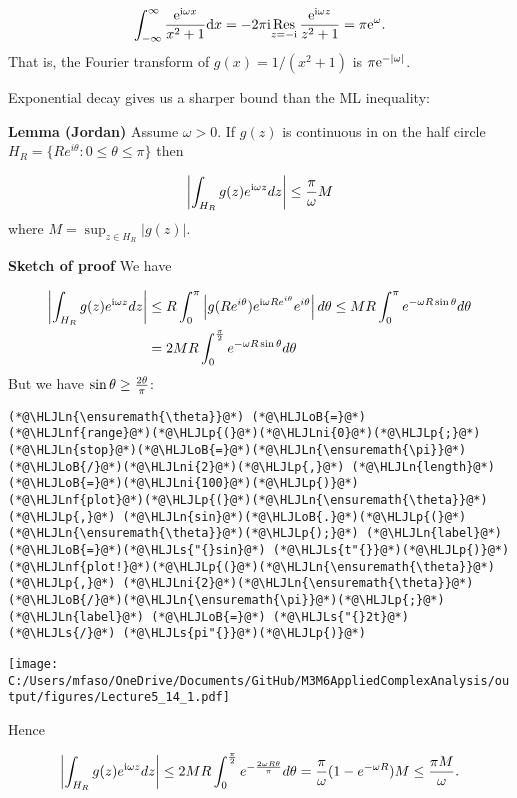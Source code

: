 \documentclass[12pt,a4paper]{article}
\newcommand{\HLJLn}[1]{#1}
\newcommand{\HLJLnf}[1]{\textcolor[RGB]{66,102,213}{#1}}
\newcommand{\HLJLs}[1]{\textcolor[RGB]{201,61,57}{#1}}
\newcommand{\HLJLni}[1]{\textcolor[RGB]{59,151,46}{#1}}
\newcommand{\HLJLoB}[1]{\textcolor[RGB]{102,102,102}{\textbf{#1}}}
\newcommand{\HLJLp}[1]{#1}
\def\D{ {\rm d} }
\def\I{ {\rm i} }
\def\E{ {\rm e} }
\def\Res_#1{\underset{#1}{\rm Res}\,}
\begin{document}
\[
\int_{-\infty}^\infty {\E^{\I \omega x } \over x^2 + 1} \D x = -2 \pi \I \Res_{z = -\I} {\E^{\I \omega z } \over z^2 + 1} = \pi \E^{\omega}.
\]
That is, the Fourier transform of $g(x) = 1/(x^2+1)$ is $\pi \E^{-|\omega|}$.

Exponential decay gives us a  sharper bound than the ML inequality:

\textbf{Lemma (Jordan)} Assume $\omega > 0$. If $g(z)$ is continuous in on the half circle $H_R = \{ R e^{i \theta} : 0 \leq \theta \leq \pi \}$  then

\[
\left| \int_{H_R} g(z) e^{\I \omega z} dz \right| \leq {\pi \over \omega} M
\]
where $M = \sup_{z \in H_R} |g(z)|$.

\textbf{Sketch of proof} We have


\begin{align*}
\left| \int_{H_R} g(z) e^{\I \omega z} dz \right|  & \leq   R \int_0^\pi \left|g(R e^{i \theta}) e^{\I \omega R e^{i \theta}}e^{i \theta}\right| d\theta
\leq MR \int_0^\pi e^{- \omega R\sin \theta } d\theta
\\
&= 2MR \int_0^{\pi\over 2} e^{- \omega R\sin \theta } d\theta
\end{align*}
But we have $\sin \theta \geq {2 \theta \over \pi}$:


\begin{lstlisting}
(*@\HLJLn{\ensuremath{\theta}}@*) (*@\HLJLoB{=}@*) (*@\HLJLnf{range}@*)(*@\HLJLp{(}@*)(*@\HLJLni{0}@*)(*@\HLJLp{;}@*) (*@\HLJLn{stop}@*)(*@\HLJLoB{=}@*)(*@\HLJLn{\ensuremath{\pi}}@*)(*@\HLJLoB{/}@*)(*@\HLJLni{2}@*)(*@\HLJLp{,}@*) (*@\HLJLn{length}@*)(*@\HLJLoB{=}@*)(*@\HLJLni{100}@*)(*@\HLJLp{)}@*)
(*@\HLJLnf{plot}@*)(*@\HLJLp{(}@*)(*@\HLJLn{\ensuremath{\theta}}@*)(*@\HLJLp{,}@*) (*@\HLJLn{sin}@*)(*@\HLJLoB{.}@*)(*@\HLJLp{(}@*)(*@\HLJLn{\ensuremath{\theta}}@*)(*@\HLJLp{);}@*) (*@\HLJLn{label}@*)(*@\HLJLoB{=}@*)(*@\HLJLs{"{}sin}@*) (*@\HLJLs{t"{}}@*)(*@\HLJLp{)}@*)
(*@\HLJLnf{plot!}@*)(*@\HLJLp{(}@*)(*@\HLJLn{\ensuremath{\theta}}@*)(*@\HLJLp{,}@*) (*@\HLJLni{2}@*)(*@\HLJLn{\ensuremath{\theta}}@*)(*@\HLJLoB{/}@*)(*@\HLJLn{\ensuremath{\pi}}@*)(*@\HLJLp{;}@*) (*@\HLJLn{label}@*) (*@\HLJLoB{=}@*) (*@\HLJLs{"{}2t}@*) (*@\HLJLs{/}@*) (*@\HLJLs{pi"{}}@*)(*@\HLJLp{)}@*)
\end{lstlisting}

\texttt{[image: C:/Users/mfaso/OneDrive/Documents/GitHub/M3M6AppliedComplexAnalysis/output/figures/Lecture5\_14\_1.pdf]}

Hence

\[
\left| \int_{H_R} g(z) e^{\I \omega z} dz \right|  \leq  2MR \int_0^{\pi\over 2} e^{- {2\omega R\theta \over \pi} } d\theta = {\pi \over \omega} (1 - e^{-\omega R}) M \leq {\pi M \over \omega}.
\]
\end{document}
